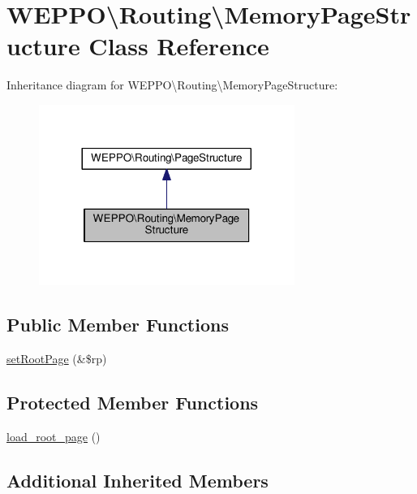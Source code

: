 \hypertarget{classWEPPO_1_1Routing_1_1MemoryPageStructure}{}\section{W\+E\+P\+PO\textbackslash{}Routing\textbackslash{}Memory\+Page\+Structure Class Reference}
\label{classWEPPO_1_1Routing_1_1MemoryPageStructure}


Inheritance diagram for W\+E\+P\+PO\textbackslash{}Routing\textbackslash{}Memory\+Page\+Structure\+:\nopagebreak
\begin{figure}[H]
\begin{center}
\leavevmode
\includegraphics[width=236pt]{classWEPPO_1_1Routing_1_1MemoryPageStructure__inherit__graph}
\end{center}
\end{figure}
\subsection*{Public Member Functions}
\begin{DoxyCompactItemize}
\item 
\hyperlink{classWEPPO_1_1Routing_1_1MemoryPageStructure_ab10545a0f01b2325474c492c8804f7ac}{set\+Root\+Page} (\&\$rp)
\end{DoxyCompactItemize}
\subsection*{Protected Member Functions}
\begin{DoxyCompactItemize}
\item 
\hyperlink{classWEPPO_1_1Routing_1_1MemoryPageStructure_a639c5cb2b9793f6485cec9ab9821b955}{load\+\_\+root\+\_\+page} ()
\end{DoxyCompactItemize}
\subsection*{Additional Inherited Members}


